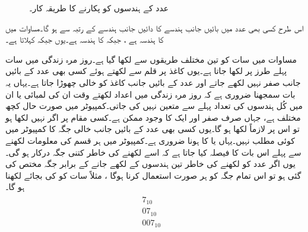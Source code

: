 \begin{figure}
\centering
\begin{subfigure}{0.45\textwidth}
\centering
{}
\end{subfigure}\hfill
\begin{subfigure}{0.45\textwidth}
\centering
{}
\end{subfigure}
\caption{عدد کے ہندسوں کو پکارنے کا طریقہ کار۔}
\label{شکل_ثنائی_ہندسوں_کے_نام}
\end{figure}

اس طرح کسی بھی عدد میں بائیں جانب ہندسے کا  دائیں جانب ہندسے کے رتبہ سے   ہو گا۔مساوات  میں کا ہندسہ  ہے ، جبکہ  کا ہندسہ ہے۔یوں   جبکہ   کہلاتا ہے۔
	
مساوات  میں سات کو تین مختلف طریقوں سے لکھا گیا ہے۔روز مرہ زندگی میں سات پہلے طرز پر لکھا جاتا ہے۔یوں کاغذ پر  قلم سے لکھتے ہوئے کسی بھی عدد کے بائیں جانب   صفر نہیں لکھے جاتے اور عدد کے بائیں جانب کاغذ کو خالی چھوڑا جاتا ہے۔یہاں یہ بات سمجھنا ضروری ہے کہ روز مرہ زندگی میں اعداد لکھتے وقت ان کی لمبائی یا ان میں کُل ہندسوں کی تعداد پہلے سے متعین نہیں کی جاتی۔کمپیوٹر میں صورت حال  کچھ مختلف ہے، جہاں صرف صفر  اور ایک  کا وجود ممکن ہے۔کسی مقام پر اگر  نہیں لکھا ہو تو اس پر  لازماً  لکھا ہو گا۔یوں کسی بھی عدد کے بائیں جانب خالی جگہ کا کمپیوٹر میں کوئی مطلب نہیں۔یہاں  یا  کا ہونا ضروری ہے۔کمپیوٹر میں ہر قسم کی معلومات لکھنے سے پہلے اس بات کا فیصلہ کیا جاتا ہے کہ اسے لکھنے کی خاطر کتنی جگہ درکار ہو گی۔یوں اگر عدد کو لکھنے کی خاطر تین ہندسوں کے لکھے جانے کے برابر جگہ مختص کی گئی ہو تو اس تمام جگہ کو ہر صورت استعمال کرنا ہوگا ، مثلاً سات کو  کی بجائے  لکھنا ہو گا۔
\begin{gather}
\begin{aligned}\label{مساوات_ثنائی_ہندسوں}
7_{10} &\\
07_{10}&\\
007_{10}&
\end{aligned}
\end{gather}

